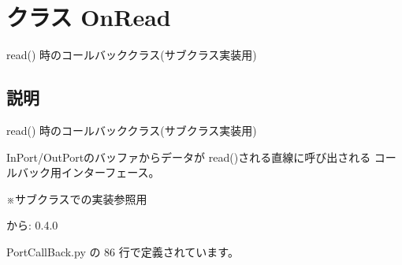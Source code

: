 \section{クラス OnRead}
\label{classsource__py_1_1_port_call_back_1_1_on_read}
read() 時のコールバッククラス(サブクラス実装用)  




\subsection{説明}
read() 時のコールバッククラス(サブクラス実装用) 

InPort/OutPortのバッファからデータが read()される直線に呼び出される コールバック用インターフェース。\par
 ※サブクラスでの実装参照用

\begin{Desc}
\item[から:]0.4.0 \end{Desc}


 PortCallBack.py の 86 行で定義されています。